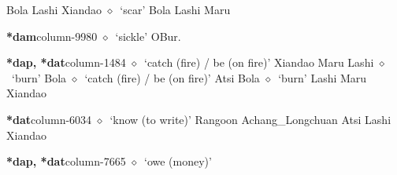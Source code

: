 \hspace{1ex}
         Bola 
\hspace{1ex}
         Lashi 
\hspace{1ex}
         Xiandao 
\hspace{1ex}
         $\diamond$~`scar'
         Bola 
\hspace{1ex}
         Lashi 
\hspace{1ex}
         Maru 
  \item {\footnotesize \textbf{*dam}}{\tiny column-9980}
         $\diamond$~`sickle'
         OBur. 
  \item {\footnotesize \textbf{*dap, *dat}}{\tiny column-1484}
         $\diamond$~`catch (fire) / be (on fire)'
         Xiandao 
\hspace{1ex}
         Maru 
\hspace{1ex}
         Lashi 
\hspace{1ex}
         $\diamond$~`burn'
         Bola 
\hspace{1ex}
         $\diamond$~`catch (fire) / be (on fire)'
         Atsi 
\hspace{1ex}
         Bola 
\hspace{1ex}
         $\diamond$~`burn'
         Lashi 
\hspace{1ex}
         Maru 
\hspace{1ex}
         Xiandao 
  \item {\footnotesize \textbf{*dat}}{\tiny column-6034}
         $\diamond$~`know (to write)'
         Rangoon 
\hspace{1ex}
         Achang\_Longchuan 
\hspace{1ex}
         Atsi 
\hspace{1ex}
         Lashi 
\hspace{1ex}
         Xiandao 
  \item {\footnotesize \textbf{*dap, *dat}}{\tiny column-7665}
         $\diamond$~`owe (money)'
